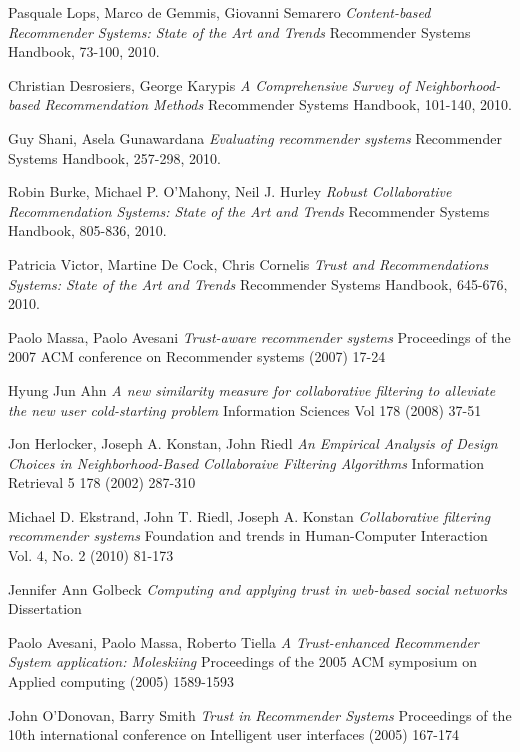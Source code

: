 \documentclass{VUMIFInfMagistrinis}
\begin{document}
\begin{thebibliography}{17}
Pasquale Lops, Marco de Gemmis, Giovanni Semarero
\textit{Content-based Recommender Systems: State of the Art and Trends}
Recommender Systems Handbook, 73-100, 2010.
	
Christian Desrosiers, George Karypis
\textit{A Comprehensive Survey of Neighborhood-based Recommendation Methods}
Recommender Systems Handbook, 101-140, 2010.

Guy Shani, Asela Gunawardana
\textit{Evaluating recommender systems}
Recommender Systems Handbook, 257-298, 2010.
	
Robin Burke, Michael P. O'Mahony, Neil J. Hurley
\textit{Robust Collaborative Recommendation Systems: State of the Art and Trends}
Recommender Systems Handbook, 805-836, 2010.	
		
Patricia Victor, Martine De Cock, Chris Cornelis
\textit{Trust and Recommendations Systems: State of the Art and Trends}
Recommender Systems Handbook, 645-676, 2010.
	

	
Paolo Massa, Paolo Avesani
\textit{Trust-aware recommender systems}
Proceedings of the 2007 ACM conference on Recommender systems (2007) 17-24
	
Hyung Jun Ahn
\textit{A new similarity measure for collaborative filtering to alleviate the new user cold-starting problem}
Information Sciences Vol 178 (2008) 37-51
	
Jon Herlocker, Joseph A. Konstan, John Riedl
\textit{An Empirical Analysis of Design Choices in Neighborhood-Based Collaboraive Filtering Algorithms}
Information Retrieval 5 178 (2002) 287-310
	
Michael D. Ekstrand, John T. Riedl, Joseph A. Konstan
\textit{Collaborative filtering recommender systems}
Foundation and trends in Human-Computer Interaction Vol. 4, No. 2 (2010) 81-173

Jennifer Ann Golbeck
\textit{Computing and applying trust in web-based social networks}
Dissertation
	
Paolo Avesani, Paolo Massa, Roberto Tiella
\textit{A Trust-enhanced Recommender System application: Moleskiing}
Proceedings of the 2005 ACM symposium on Applied computing (2005) 1589-1593 
	
John O'Donovan, Barry Smith
\textit{Trust in Recommender Systems}
Proceedings of the 10th international conference on Intelligent user interfaces (2005) 167-174
	

\end{thebibliography}
\end{document}
